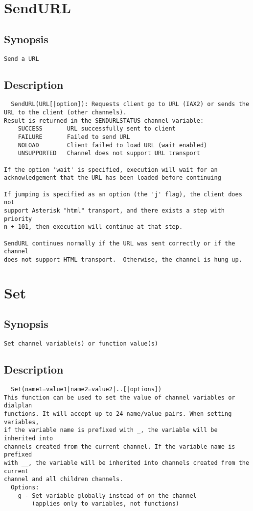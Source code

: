 \section{SendURL}
\subsection{Synopsis}
\begin{verbatim}
Send a URL
\end{verbatim}
\subsection{Description}
\begin{verbatim}
  SendURL(URL[|option]): Requests client go to URL (IAX2) or sends the 
URL to the client (other channels).
Result is returned in the SENDURLSTATUS channel variable:
    SUCCESS       URL successfully sent to client
    FAILURE       Failed to send URL
    NOLOAD        Client failed to load URL (wait enabled)
    UNSUPPORTED   Channel does not support URL transport

If the option 'wait' is specified, execution will wait for an
acknowledgement that the URL has been loaded before continuing

If jumping is specified as an option (the 'j' flag), the client does not
support Asterisk "html" transport, and there exists a step with priority
n + 101, then execution will continue at that step.

SendURL continues normally if the URL was sent correctly or if the channel
does not support HTML transport.  Otherwise, the channel is hung up.

\end{verbatim}


\section{Set}
\subsection{Synopsis}
\begin{verbatim}
Set channel variable(s) or function value(s)
\end{verbatim}
\subsection{Description}
\begin{verbatim}
  Set(name1=value1|name2=value2|..[|options])
This function can be used to set the value of channel variables or dialplan
functions. It will accept up to 24 name/value pairs. When setting variables,
if the variable name is prefixed with _, the variable will be inherited into
channels created from the current channel. If the variable name is prefixed
with __, the variable will be inherited into channels created from the current
channel and all children channels.
  Options:
    g - Set variable globally instead of on the channel
        (applies only to variables, not functions)

\end{verbatim}


